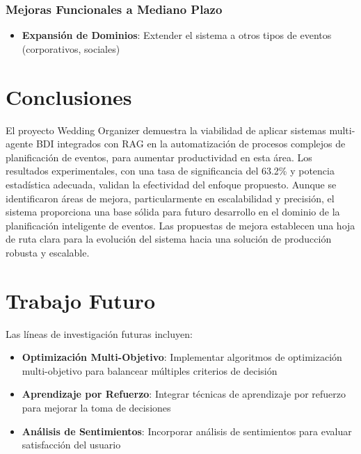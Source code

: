 \documentclass[runningheads,a4paper]{llncs}
\begin{document}
\subsubsection{Mejoras Funcionales a Mediano Plazo}
\begin{itemize}
    \item \textbf{Expansión de Dominios}: Extender el sistema a otros tipos de eventos (corporativos, sociales)
\end{itemize}


\section{Conclusiones}

El proyecto Wedding Organizer demuestra la viabilidad de aplicar sistemas multi-agente BDI integrados con RAG en la automatización de procesos complejos de planificación de eventos, para aumentar productividad en esta área. Los resultados experimentales, con una tasa de significancia del 63.2\% y potencia estadística adecuada, validan la efectividad del enfoque propuesto.
Aunque se identificaron áreas de mejora, particularmente en escalabilidad y precisión, el sistema proporciona una base sólida para futuro desarrollo en el dominio de la planificación inteligente de eventos. Las propuestas de mejora establecen una hoja de ruta clara para la evolución del sistema hacia una solución de producción robusta y escalable.

\section{Trabajo Futuro}

Las líneas de investigación futuras incluyen:

\begin{itemize}
    \item \textbf{Optimización Multi-Objetivo}: Implementar algoritmos de optimización multi-objetivo para balancear múltiples criterios de decisión
    \item \textbf{Aprendizaje por Refuerzo}: Integrar técnicas de aprendizaje por refuerzo para mejorar la toma de decisiones
    \item \textbf{Análisis de Sentimientos}: Incorporar análisis de sentimientos para evaluar satisfacción del usuario
\end{itemize}
\end{document}
